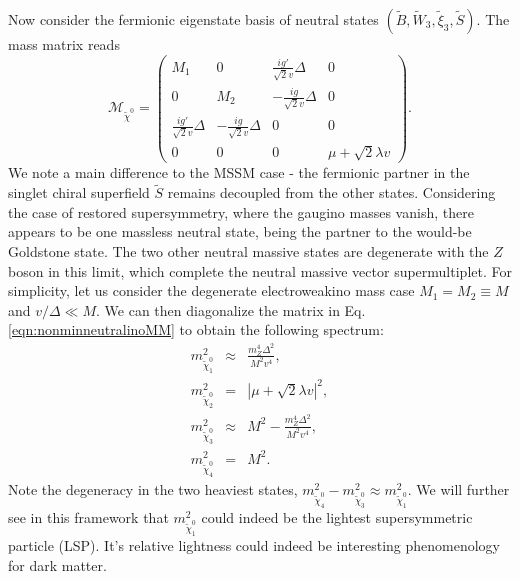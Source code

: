 Now consider the fermionic eigenstate basis of neutral states $(\tilde{B},\tilde{W}_3,\tilde{\xi}_3,\tilde{S})$. The mass matrix reads
\begin{equation}
\mathcal{M}_{\tilde{\chi}^0}=
\begin{pmatrix} M_1 & 0 & \frac{ig'}{\sqrt{2}v}\Delta & 0\\
0 & M_2 & -\frac{ig}{\sqrt{2}v}\Delta & 0\\
\frac{ig'}{\sqrt{2}v}\Delta & -\frac{ig}{\sqrt{2}v}\Delta & 0 & 0\\
0 & 0 & 0 & \mu + \sqrt{2}\lambda v
\end{pmatrix}.
\label{eqn:nonminneutralinoMM}
\end{equation}
We note a main difference to the MSSM case - the fermionic partner in the singlet chiral superfield $\tilde{S}$ remains decoupled from the other states. Considering the case of restored supersymmetry, where the gaugino masses vanish, there appears to be one massless neutral state, being the partner to the would-be Goldstone state. The two other neutral massive states are degenerate with the $Z$ boson in this limit, which complete the neutral massive vector supermultiplet. For simplicity, let us consider the degenerate electroweakino mass case $M_1 = M_2 \equiv M$ and $v/\Delta \ll M$. We can then diagonalize the matrix in Eq. \ref{eqn:nonminneutralinoMM} to obtain the following spectrum:
\begin{eqnarray}
m^2_{\tilde{\chi}^0_1}&\approx& \frac{m^4_Z\Delta^2}{M^2v^4}, \\
m^2_{\tilde{\chi}^0_2}&=& |\mu +\sqrt{2}\lambda v|^2, \\
m^2_{\tilde{\chi}^0_3}&\approx& M^2-\frac{m^4_Z\Delta^2}{M^2v^4}, \\
m^2_{\tilde{\chi}^0_4}&=& M^2.
\end{eqnarray}
Note the degeneracy in the two heaviest states, $m^2_{\tilde{\chi}^0_4}-m^2_{\tilde{\chi}^0_3} \approx m^2_{\tilde{\chi}^0_1}$. We will further see in this framework that $m^2_{\tilde{\chi}^0_1}$ could indeed be the lightest supersymmetric particle (LSP). It's relative lightness could indeed be interesting phenomenology for dark matter.

